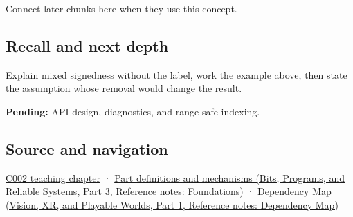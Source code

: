 \hypertarget{appendix-736a2345de4a-used-by}{}

Connect later chunks here when they use this concept.

\subsection{Recall and next depth}\label{appendix-736a2345de4a-recall-and-next-depth}

\hypertarget{appendix-736a2345de4a-recall-and-next-depth}{}

Explain mixed signedness without the label, work the example above, then state the assumption whose removal would change the result.

\textbf{Pending:} API design, diagnostics, and range-safe indexing.

\subsection{Source and navigation}\label{appendix-736a2345de4a-source-and-navigation}

\hypertarget{appendix-736a2345de4a-source-and-navigation}{}

\hyperref[01-foundations-i-ch001-arithmetic-becomes-a-policy]{C002 teaching chapter} · \href{../01-Bits-Programs-and-Reliable-Systems-P03/main.pdf\#nameddest=appendix-fd090d982a15}{Part definitions and mechanisms (Bits, Programs, and Reliable Systems, Part 3, Reference notes: Foundations)} · \href{../07-Vision-XR-and-Playable-Worlds-P01/main.pdf\#nameddest=appendix-4ad47bdd269a}{Dependency Map (Vision, XR, and Playable Worlds, Part 1, Reference notes: Dependency Map)}

